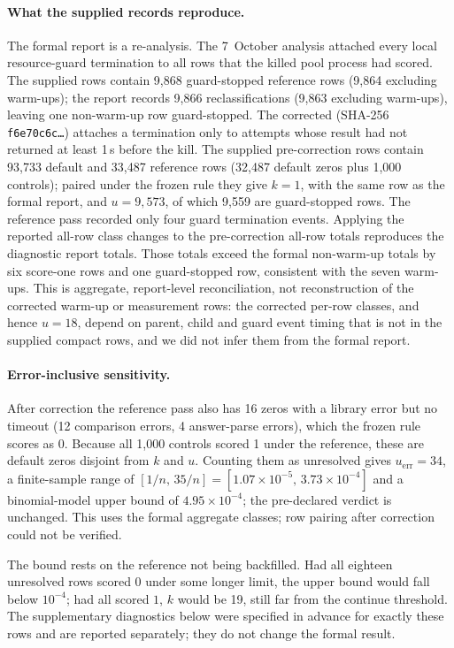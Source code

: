 \documentclass[10pt,a4paper]{article}
\begin{document}
\paragraph{What the supplied records reproduce.}
The formal report is a re-analysis. The 7~October analysis attached every
local resource-guard termination to all rows that the killed pool process
had scored. The supplied rows contain 9,868 guard-stopped reference rows
(9,864 excluding warm-ups); the report records 9,866 reclassifications
(9,863 excluding warm-ups), leaving one non-warm-up row guard-stopped.
The corrected  (SHA-256
\texttt{f6e70c6c\ldots}) attaches a termination only to attempts whose result
had not returned at least 1\,s before the kill. The supplied pre-correction
rows contain 93,733 default and 33,487
reference rows (32,487 default zeros plus 1,000 controls); paired under the
frozen rule they give $k=1$, with the same row as the formal report, and
$u=9{,}573$, of which 9,559 are guard-stopped rows. The reference pass
recorded only four guard termination events. Applying the reported all-row class
changes to the pre-correction all-row totals reproduces the diagnostic
report totals. Those totals exceed the formal non-warm-up totals by six
score-one rows and one guard-stopped row, consistent with the seven warm-ups.
This is aggregate, report-level reconciliation, not reconstruction of the
corrected warm-up or measurement rows:
the corrected per-row classes, and hence $u=18$, depend on parent, child and
guard event timing that is not in the supplied compact rows, and we did not
infer them from the formal report.

\paragraph{Error-inclusive sensitivity.}
After correction the reference pass also has 16 zeros with a library error but
no timeout (12 comparison errors, 4 answer-parse errors), which the frozen
rule scores as $0$. Because all 1,000 controls scored 1 under the reference,
these are default zeros disjoint from $k$ and $u$. Counting them as unresolved
gives $u_{\mathrm{err}}=34$, a finite-sample range of
$[1/n,\,35/n]=[1.07\times10^{-5},\,3.73\times10^{-4}]$ and a binomial-model
upper bound of $4.95\times10^{-4}$; the pre-declared verdict is unchanged.
This uses the formal aggregate classes; row pairing after correction could
not be verified.

The bound rests on the reference not being backfilled. Had all eighteen
unresolved rows scored $0$ under some longer limit, the upper bound would fall
below $10^{-4}$; had all scored $1$, $k$ would be 19, still far from the
continue threshold. The supplementary diagnostics below were specified in
advance for exactly these rows and are reported separately; they do not
change the formal result.
\end{document}
